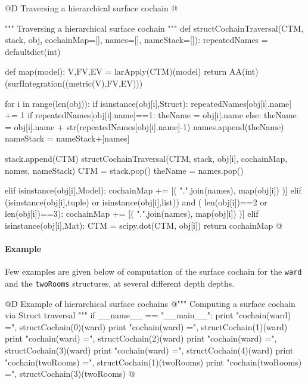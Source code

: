 \documentclass[11pt,oneside]{article}    %
\begin{document}
@D Traversing a hierarchical surface cochain
@{""" Traversing a hierarchical surface cochain """
def structCochainTraversal(CTM, stack, obj, cochainMap=[], names=[], nameStack=[]):
    repeatedNames = defaultdict(int)
    
    def map(model):
        V,FV,EV = larApply(CTM)(model)
        return AA(int)(surfIntegration((metric(V),FV,EV)))
    
    for i in range(len(obj)):
        if isinstance(obj[i],Struct):
            repeatedNames[obj[i].name] += 1
            if repeatedNames[obj[i].name]==1: theName = obj[i].name
            else: theName = obj[i].name + str(repeatedNames[obj[i].name]-1)
            names.append(theName)
            nameStack = nameStack+[names]
            
            stack.append(CTM) 
            structCochainTraversal(CTM, stack, obj[i], cochainMap, names, nameStack)
            CTM = stack.pop()
            theName = names.pop()
            
        elif isinstance(obj[i],Model): 
            cochainMap += [( ".".join(names), map(obj[i]) )]
        elif (isinstance(obj[i],tuple) or isinstance(obj[i],list)) and (
              len(obj[i])==2 or len(obj[i])==3):
            cochainMap += [( ".".join(names), map(obj[i]) )]
        elif isinstance(obj[i],Mat): 
            CTM = scipy.dot(CTM, obj[i])
    return cochainMap
@}

\paragraph{Example}

Few examples are given below of computation of the surface cochain for the \texttt{ward} and the \texttt{twoRooms} structures, at several different depth depths.

@D Example of hierarchical surface cochains
@{""" Computing a surface cochain via Struct traversal """
if __name__ == "__main__":
    print "\nsurface cochain(ward) =", structCochain(0)(ward)
    print "\nsurface cochain(ward) =", structCochain(1)(ward)
    print "\nsurface cochain(ward) =", structCochain(2)(ward)
    print "\nsurface cochain(ward) =", structCochain(3)(ward)
    print "\nsurface cochain(ward) =", structCochain(4)(ward)
    print "\nsurface cochain(twoRooms) =", structCochain(1)(twoRooms)
    print "\nsurface cochain(twoRooms) =", structCochain(3)(twoRooms)
@}
\end{document}
